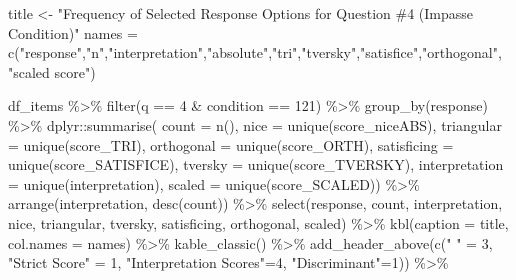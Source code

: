 \documentclass[
  letterpaper,
  DIV=11,
  numbers=noendperiod]{scrreprt}
\newenvironment{Shaded}{\begin{snugshade}}{\end{snugshade}}
\newcommand{\AttributeTok}[1]{\textcolor[rgb]{0.40,0.45,0.13}{#1}}
\newcommand{\DecValTok}[1]{\textcolor[rgb]{0.68,0.00,0.00}{#1}}
\newcommand{\FunctionTok}[1]{\textcolor[rgb]{0.28,0.35,0.67}{#1}}
\newcommand{\NormalTok}[1]{\textcolor[rgb]{0.00,0.23,0.31}{#1}}
\newcommand{\OtherTok}[1]{\textcolor[rgb]{0.00,0.23,0.31}{#1}}
\newcommand{\SpecialCharTok}[1]{\textcolor[rgb]{0.37,0.37,0.37}{#1}}
\newcommand{\StringTok}[1]{\textcolor[rgb]{0.13,0.47,0.30}{#1}}
\begin{document}
\begin{Shaded}
\begin{Highlighting}[]
\NormalTok{title }\OtherTok{\textless{}{-}} \StringTok{"Frequency of Selected Response Options for Question \#4 (Impasse Condition)"}
\NormalTok{names }\OtherTok{=} \FunctionTok{c}\NormalTok{(}\StringTok{"response"}\NormalTok{,}\StringTok{"n"}\NormalTok{,}\StringTok{"interpretation"}\NormalTok{,}\StringTok{"absolute"}\NormalTok{,}\StringTok{"tri"}\NormalTok{,}\StringTok{"tversky"}\NormalTok{,}\StringTok{"satisfice"}\NormalTok{,}\StringTok{"orthogonal"}\NormalTok{, }\StringTok{"scaled score"}\NormalTok{)}

\NormalTok{df\_items }\SpecialCharTok{\%\textgreater{}\%} \FunctionTok{filter}\NormalTok{(q }\SpecialCharTok{==} \DecValTok{4} \SpecialCharTok{\&}\NormalTok{ condition }\SpecialCharTok{==} \DecValTok{121}\NormalTok{) }\SpecialCharTok{\%\textgreater{}\%} \FunctionTok{group\_by}\NormalTok{(response) }\SpecialCharTok{\%\textgreater{}\%} 
\NormalTok{  dplyr}\SpecialCharTok{::}\FunctionTok{summarise}\NormalTok{( }\AttributeTok{count =} \FunctionTok{n}\NormalTok{(), }
                    \AttributeTok{nice =} \FunctionTok{unique}\NormalTok{(score\_niceABS),}
                    \AttributeTok{triangular =} \FunctionTok{unique}\NormalTok{(score\_TRI), }
                    \AttributeTok{orthogonal =}  \FunctionTok{unique}\NormalTok{(score\_ORTH),}
                    \AttributeTok{satisficing =}  \FunctionTok{unique}\NormalTok{(score\_SATISFICE),}
                    \AttributeTok{tversky =} \FunctionTok{unique}\NormalTok{(score\_TVERSKY),}
                    \AttributeTok{interpretation =} \FunctionTok{unique}\NormalTok{(interpretation),}
                    \AttributeTok{scaled =} \FunctionTok{unique}\NormalTok{(score\_SCALED)) }\SpecialCharTok{\%\textgreater{}\%} 
  \FunctionTok{arrange}\NormalTok{(interpretation, }\FunctionTok{desc}\NormalTok{(count)) }\SpecialCharTok{\%\textgreater{}\%} 
  \FunctionTok{select}\NormalTok{(response, count, interpretation, nice, }
\NormalTok{         triangular, tversky, satisficing, orthogonal, scaled) }\SpecialCharTok{\%\textgreater{}\%} 
  \FunctionTok{kbl}\NormalTok{(}\AttributeTok{caption =}\NormalTok{ title, }\AttributeTok{col.names =}\NormalTok{ names) }\SpecialCharTok{\%\textgreater{}\%}  \FunctionTok{kable\_classic}\NormalTok{() }\SpecialCharTok{\%\textgreater{}\%} 
  \FunctionTok{add\_header\_above}\NormalTok{(}\FunctionTok{c}\NormalTok{(}\StringTok{" "} \OtherTok{=} \DecValTok{3}\NormalTok{, }\StringTok{"Strict Score"} \OtherTok{=} \DecValTok{1}\NormalTok{, }\StringTok{"Interpretation Scores"}\OtherTok{=}\DecValTok{4}\NormalTok{, }\StringTok{"Discriminant"}\OtherTok{=}\DecValTok{1}\NormalTok{)) }\SpecialCharTok{\%\textgreater{}\%}

\end{Highlighting}
\end{Shaded}
\end{document}
